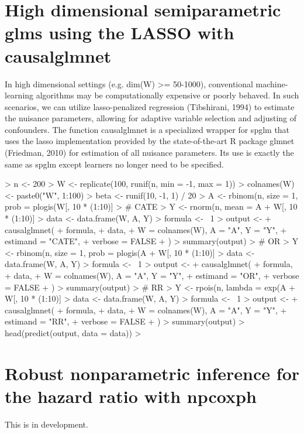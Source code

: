 \documentclass[article]{jss}
\begin{document}
\section{High dimensional semiparametric glms using the LASSO with causalglmnet}
In high dimensional settings (e.g. dim(W) >= 50-1000), conventional machine-learning algorithms may be computationally expensive or poorly behaved. In such scenarios, we can utilize lasso-penalized regression (Tibshirani, 1994) to estimate the nuisance parameters, allowing for adaptive variable selection and adjusting of confounders. The function causalglmnet is a specialized wrapper for spglm that uses the lasso implementation provided by the state-of-the-art R package glmnet (Friedman, 2010) for estimation of all nuisance parameters.\nocite{Friedman2010}\nocite{Tibshirani94regressionshrinkage} Its use is exactly the same as spglm except learners no longer need to be specified.

\begin{Schunk}
\begin{Sinput}
> n <- 200
> W <- replicate(100, runif(n, min = -1, max = 1))
> colnames(W) <- paste0("W", 1:100)
> beta <- runif(10, -1, 1) / 20
> A <- rbinom(n, size = 1, prob = plogis(W[, 10 * (1:10)] %*% beta))
> # CATE
> Y <- rnorm(n, mean = A + W[, 10 * (1:10)] %*% beta, sd = 0.5)
> data <- data.frame(W, A, Y)
> formula <- ~1
> output <-
+   causalglmnet(
+     formula,
+     data,
+     W = colnames(W), A = "A", Y = "Y",
+     estimand = "CATE",
+     verbose = FALSE
+   )
> summary(output)
> # OR
> Y <- rbinom(n, size = 1, prob = plogis(A + W[, 10 * (1:10)] %*% beta))
> data <- data.frame(W, A, Y)
> formula <- ~1
> output <-
+   causalglmnet(
+     formula,
+     data,
+     W = colnames(W), A = "A", Y = "Y",
+     estimand = "OR",
+     verbose = FALSE
+   )
> summary(output)
> # RR
> Y <- rpois(n, lambda = exp(A + W[, 10 * (1:10)] %*% beta))
> data <- data.frame(W, A, Y)
> formula <- ~1
> output <-
+   causalglmnet(
+     formula,
+     data,
+     W = colnames(W), A = "A", Y = "Y",
+     estimand = "RR",
+     verbose = FALSE
+   )
> summary(output)
> head(predict(output, data = data))
> 
\end{Sinput}
\end{Schunk}



\section{Robust nonparametric inference for the hazard ratio with npcoxph}
This is in development. \nocite{vanderLaanetal2007}



\end{document}
